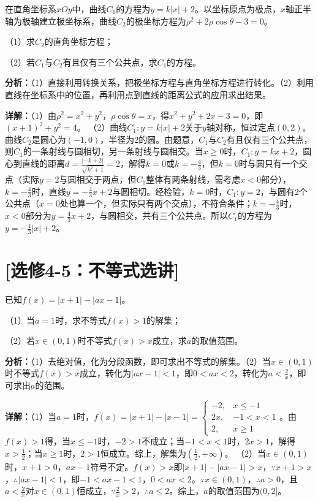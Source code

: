 \begin{question}[points=10]
在直角坐标系$xOy$中，曲线$C_1$的方程为$y=k|x|+2$。以坐标原点为极点，$x$轴正半轴为极轴建立极坐标系，曲线$C_2$的极坐标方程为$\rho^2+2\rho\cos\theta-3=0$。

（1）求$C_2$的直角坐标方程；

（2）若$C_1$与$C_2$有且仅有三个公共点，求$C_1$的方程。
\begin{solution}

\textbf{分析：}（1）直接利用转换关系，把极坐标方程与直角坐标方程进行转化。（2）利用直线在坐标系中的位置，再利用点到直线的距离公式的应用求出结果。

\textbf{详解：}（1）由$\rho^2=x^2+y^2$，$\rho\cos\theta=x$，得$x^2+y^2+2x-3=0$，即$(x+1)^2+y^2=4$。
（2）曲线$C_1:y=k|x|+2$关于$y$轴对称，恒过定点$(0,2)$。曲线$C_2$是圆心为$(-1,0)$，半径为2的圆。由题意，$C_1$与$C_2$有且仅有三个公共点，则$C_1$的一条射线与圆相切，另一条射线与圆相交。当$x\geq0$时，$C_1:y=kx+2$，圆心到直线的距离$d=\frac{|-k+2|}{\sqrt{k^2+1}}=2$，解得$k=0$或$k=-\frac{4}{3}$，但$k=0$时与圆只有一个交点（实际$y=2$与圆相交于两点，但$C_1$整体有两条射线，需考虑$x<0$部分），$k=-\frac{4}{3}$时，直线$y=-\frac{4}{3}x+2$与圆相切。经检验，$k=0$时，$C_1:y=2$，与圆有2个公共点（$x=0$处也算一个，但实际只有两个交点），不符合条件；$k=-\frac{4}{3}$时，$x<0$部分为$y=\frac{4}{3}x+2$，与圆相交，共有三个公共点。所以$C_1$的方程为$y=-\frac{4}{3}|x|+2$。
\end{solution}
\end{question}

\section*{[选修4-5：不等式选讲]}

\begin{question}[points=10]
已知$f(x)=|x+1|-|ax-1|$。

（1）当$a=1$时，求不等式$f(x)>1$的解集；

（2）若$x\in(0,1)$时不等式$f(x)>x$成立，求$a$的取值范围。
\begin{solution}

\textbf{分析：}（1）去绝对值，化为分段函数，即可求出不等式的解集。（2）当$x\in(0,1)$时不等式$f(x)>x$成立，转化为$|ax-1|<1$，即$0<ax<2$，转化为$a<\frac{2}{x}$，即可求出$a$的范围。

\textbf{详解：}（1）当$a=1$时，$f(x)=|x+1|-|x-1|=\begin{cases} -2, & x\leq-1 \\ 2x, & -1<x<1 \\ 2, & x\geq1 \end{cases}$。由$f(x)>1$得，当$x\leq-1$时，$-2>1$不成立；当$-1<x<1$时，$2x>1$，解得$x>\frac{1}{2}$；当$x\geq1$时，$2>1$恒成立。综上，解集为$(\frac{1}{2},+\infty)$。
（2）当$x\in(0,1)$时，$x+1>0$，$ax-1$符号不定。$f(x)>x$即$|x+1|-|ax-1|>x$，$\because x+1>x$，$\therefore |ax-1|<1$，即$-1<ax-1<1$，$0<ax<2$。$\because x\in(0,1)$，$\therefore a>0$，且$a<\frac{2}{x}$对$x\in(0,1)$恒成立，$\because \frac{2}{x}>2$，$\therefore a\leq2$。综上，$a$的取值范围为$(0,2]$。
\end{solution}
\end{question}

